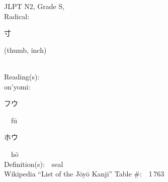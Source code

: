 \begin{multicols}{2}
{JLPT N2, Grade S, \\Radical:\ \ {\begin{CJK}{UTF8}{min} 寸 \end{CJK}} (thumb, inch) } \\
Reading(s):\ \ \\
{\hspace*{1em}}on'yomi:\ \ \\
{\hspace*{2em}}{\begin{CJK}{UTF8}{min} フウ \end{CJK}}\ \ f\=u\ \ \\
{\hspace*{2em}}{\begin{CJK}{UTF8}{min} ホウ \end{CJK}}\ \ h\=o\ \ \\
Definition(s):\ \ seal \\
Wikipedia ``List of the J\=oy\=o Kanji'' Table \#:\ \ 1\,763 \\
\ \ \\
\end{multicols}



